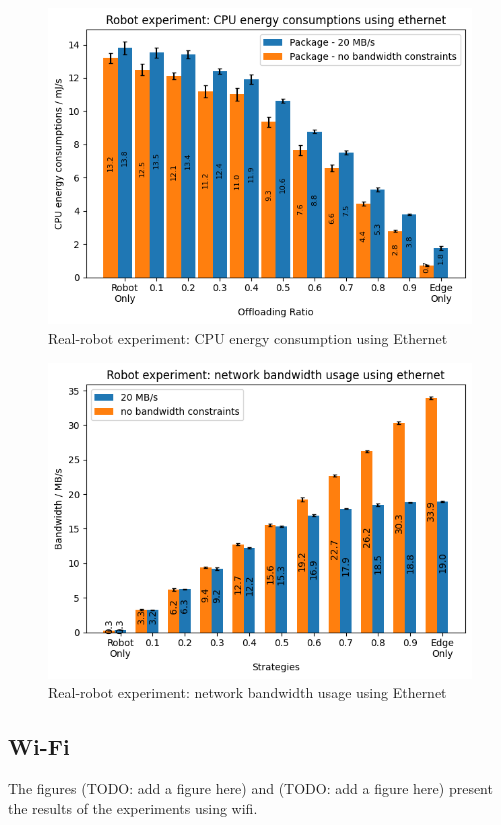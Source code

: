 \begin{figure}
    \centering
    \includegraphics[width=\linewidth]{figures/experiment/real_robot/eth/cpu_energy_consumption.png}
    \caption{Real-robot experiment: CPU energy consumption using Ethernet}
    \label{fig:real_robot_experiment:eth_cpu_energy_consumption}
\end{figure}

\begin{figure}
    \centering
    \includegraphics[width=\linewidth]{figures/experiment/real_robot/eth/bandwidth.png}
    \caption{Real-robot experiment: network bandwidth usage using Ethernet}
    \label{fig:real_robot_experiment:eth_bandwidth}
\end{figure}

\subsection{Wi-Fi}

The figures (TODO: add a figure here) and (TODO: add a figure here) present the results of the experiments using \gls{wifi}. 
